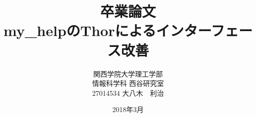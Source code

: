 \title{卒業論文\\my\_helpのThorによるインターフェース改善}
\author{関西学院大学理工学部\\情報科学科 西谷研究室\\27014534 大八木　利治}
\date{2018年3月}

\maketitle
\newpage
